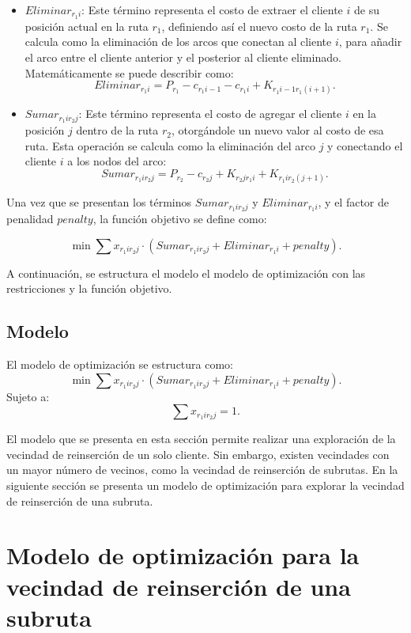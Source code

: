 \documentclass[12pt]{report}
\begin{document}
    \begin{itemize}
    	\item $Eliminar_{r_1i}$: Este término representa el costo de extraer el cliente $i$ de su posición actual en la ruta $r_1$, definiendo así el nuevo costo de la ruta $r_1$. Se calcula como la eliminación de los arcos que conectan al cliente $i$, para añadir el arco entre el cliente anterior y el posterior al cliente eliminado. Matemáticamente se puede describir como:
    	\[
    	Eliminar_{r_1i}= P_{r_1}-c_{r_1i-1}-c_{r_1i}+K_{{r_1}{i-1}{r_1}{(i+1)}}\text{.}
    	\]

    	\item $Sumar_{r_1ir_2j}$: Este término representa el costo de agregar el cliente $i$ en la posición $j$ dentro de la ruta $r_2$, otorgándole un nuevo valor al costo de esa ruta. Esta operación se calcula como la eliminación del arco $j$ y conectando el cliente $i$ a los nodos del arco:
    	\[
    	Sumar_{r_1ir_2j}= P_{r_2} - c_{{r_2}{j}} + K_{{r_2}{j}{r_1}{i}} + K_{{r_1}{i}{r_2}{(j+1)}}\text{.}
    	\]


    \end{itemize}

    Una vez que se presentan los términos $Sumar_{r_1ir_2j}$ y $Eliminar_{r_1i}$, y el factor de penalidad $penalty$, la función objetivo se define como:

	\[
	   	\min \sum x_{r_1ir_2j} \cdot (Sumar_{r_1ir_2j} + Eliminar_{r_1i} + penalty).
	\]

	A continuación, se estructura el modelo el modelo de optimización con las restricciones y la función objetivo.

	\subsection{Modelo}

	El modelo de optimización se estructura como:
	\[
	\min \sum x_{r_1ir_2j} \cdot (Sumar_{r_1ir_2j} + Eliminar_{r_1i} + penalty).
	\]
	Sujeto a:
	\[
	\sum  x_{r_1ir_2j} = 1.
	\]



	El modelo que se presenta en esta sección permite realizar una exploración de la vecindad de reinserción de un solo cliente. Sin embargo, existen vecindades con un mayor número de vecinos, como la vecindad de reinserción de subrutas. En la siguiente sección se presenta un modelo de optimización para explorar la vecindad de reinserción de una subruta.

	\section{Modelo de optimización para la vecindad de reinserción de una subruta}
	\label{sec:Modelo de optimización para la vecindad de reinserción de una subruta}
\end{document}
